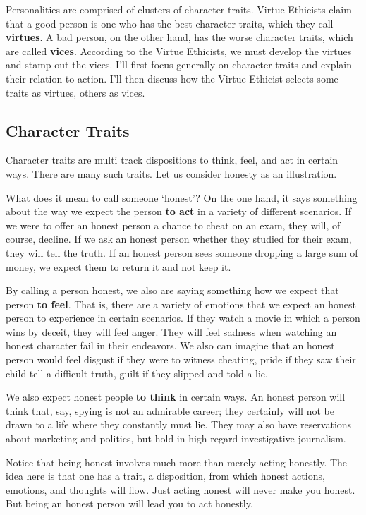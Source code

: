 \documentclass[9pt]{article}
\begin{document}
Personalities are comprised of clusters of character traits. Virtue
Ethicists claim that a good person is one who has the best character
traits, which they call \textbf{virtues}. A bad person, on the other
hand, has the worse character traits, which are called \textbf{vices}.
According to the Virtue Ethicists, we must develop the virtues and stamp
out the vices. I'll first focus generally on character traits and
explain their relation to action. I'll then discuss how the Virtue
Ethicist selects some traits as virtues, others as vices.

\subsection{Character Traits}\label{character-traits}

Character traits are multi track dispositions to think, feel, and act in
certain ways. There are many such traits. Let us consider honesty as an
illustration.

What does it mean to call someone `honest'? On the one hand, it says
something about the way we expect the person \textbf{to act} in a
variety of different scenarios. If we were to offer an honest person a
chance to cheat on an exam, they will, of course, decline. If we ask an
honest person whether they studied for their exam, they will tell the
truth. If an honest person sees someone dropping a large sum of money,
we expect them to return it and not keep it.

By calling a person honest, we also are saying something how we expect
that person \textbf{to feel}. That is, there are a variety of emotions
that we expect an honest person to experience in certain scenarios. If
they watch a movie in which a person wins by deceit, they will feel
anger. They will feel sadness when watching an honest character fail in
their endeavors. We also can imagine that an honest person would feel
disgust if they were to witness cheating, pride if they saw their child
tell a difficult truth, guilt if they slipped and told a lie.

We also expect honest people \textbf{to think} in certain ways. An
honest person will think that, say, spying is not an admirable career;
they certainly will not be drawn to a life where they constantly must
lie. They may also have reservations about marketing and politics, but
hold in high regard investigative journalism.

Notice that being honest involves much more than merely acting honestly.
The idea here is that one has a trait, a disposition, from which honest
actions, emotions, and thoughts will flow. Just acting honest will never
make you honest. But being an honest person will lead you to act
honestly.
\end{document}

